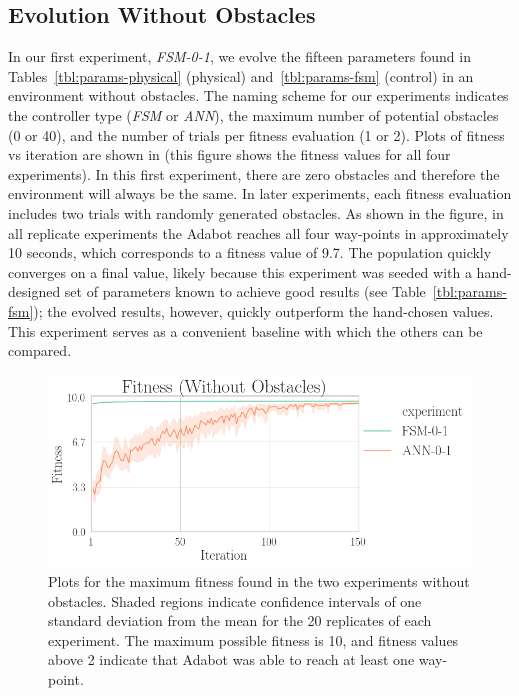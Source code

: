 \subsection{Evolution Without Obstacles}

In our first experiment, \emph{FSM-0-1}, we evolve the fifteen parameters found in Tables~\ref{tbl:params-physical} (physical) and~\ref{tbl:params-fsm} (control) in an environment without obstacles.
%
The naming scheme for our experiments indicates the controller type (\emph{FSM} or \emph{ANN}), the maximum number of potential obstacles (0 or 40), and the number of trials per fitness evaluation (1 or 2).
%
Plots of fitness vs iteration are shown in  (this figure shows the fitness values for all four experiments).
%
In this first experiment, there are zero obstacles and therefore the environment will always be the same. In later experiments, each fitness evaluation includes two trials with randomly generated obstacles.
%
As shown in the figure, in all replicate experiments the Adabot reaches all four way-points in approximately 10 seconds, which corresponds to a fitness value of 9.7.
%
The population quickly converges on a final value, likely because this experiment was seeded with a hand-designed set of parameters known to achieve good results (see Table~\ref{tbl:params-fsm}); the evolved results, however, quickly outperform the hand-chosen values.
%
This experiment serves as a convenient baseline with which the others can be compared.

\begin{figure}[!ht]
    \centering

    \includegraphics[width=\columnwidth]{figures/4-results/fitness-without.png}


    \caption{Plots for the maximum fitness found in the two experiments without obstacles. Shaded regions indicate confidence intervals of one standard deviation from the mean for the 20 replicates of each experiment. The maximum possible fitness is 10, and fitness values above 2 indicate that Adabot was able to reach at least one way-point.}
    \label{fig:fitness-vs-iteration}

\end{figure}


